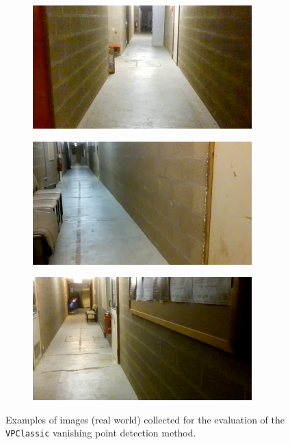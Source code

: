 \begin{figure}[H]
    \centering
    \begin{subfigure}{0.32\textwidth}
        \centering
        \includegraphics[width=\textwidth]{resources/png/07/vanishing-point/evaluation/0.png}
    \end{subfigure}
    \hfill
    \begin{subfigure}{0.32\textwidth}
        \centering
        \includegraphics[width=\textwidth]{resources/png/07/vanishing-point/evaluation/1.png}
    \end{subfigure}
    \hfill
    \begin{subfigure}{0.32\textwidth}
        \centering
        \includegraphics[width=\textwidth]{resources/png/07/vanishing-point/evaluation/2.png}
    \end{subfigure}
    \caption{Examples of images (real world) collected for the evaluation of the \texttt{VPClassic} vanishing point detection method.}
    \label{fig:07.vanishing.point.evaluation.examples}
\end{figure}


